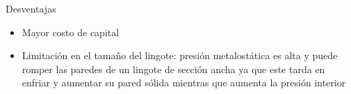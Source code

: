 Desventajas

\begin{itemize}
	\item Mayor costo de capital
	\item Limitación en el tamaño del lingote: presión metalostática es alta y puede romper las paredes de un lingote de sección ancha ya que este tarda en enfriar y aumentar su pared sólida mientras que aumenta la presión interior
\end{itemize}